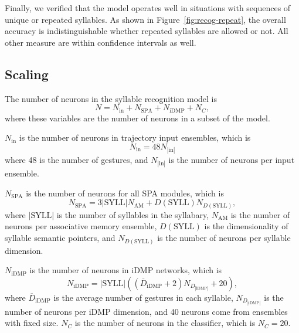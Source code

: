 
Finally, we verified that the model
operates well in situations with
sequences of unique or repeated syllables.
As shown in Figure~\ref{fig:recog-repeat},
the overall accuracy is indistinguishable
whether repeated syllables are allowed or not.
All other measure are within confidence intervals as well.

\subsection{Scaling}

The number of neurons in the
syllable recognition model is
\begin{equation}
  N = N_{\text{in}} + N_{\text{SPA}} + N_{\text{iDMP}} + N_C,
\end{equation}
where these variables
are the number of neurons in
a subset of the model.

$N_{\text{in}}$ is the number of neurons
in trajectory input ensembles, which is
\begin{equation}
  N_{\text{in}} = 48 N_{|\text{in}|}
\end{equation}
where 48 is the number of gestures,
and $N_{|\text{in}|}$ is the number of neurons
per input ensemble.

$N_{\text{SPA}}$ is the number of
neurons for all SPA modules,
which is
\begin{equation}
  N_{\text{SPA}} = 3 |\text{SYLL}| N_{\text{AM}}
    + D(\text{SYLL}) N_{D(\text{SYLL})},
\end{equation}
where $|\text{SYLL}|$ is the number of
syllables in the syllabary,
$N_{\text{AM}}$ is the number of neurons
per associative memory ensemble,
$D(\text{SYLL})$ is the dimensionality
of syllable semantic pointers,
and $N_{D(\text{SYLL})}$ is the number of neurons
per syllable dimension.

$N_{\text{iDMP}}$ is the number of neurons
in iDMP networks, which is
\begin{equation}
  N_{\text{iDMP}} = |\text{SYLL}| \left( \left(\overline{D}_{\text{iDMP}}
  + 2 \right) N_D_{|\text{iDMP}|} + 20 \right),
\end{equation}
where $\overline{D}_{\text{iDMP}}$ is the average
number of gestures in each syllable,
$N_D_{|\text{iDMP}|}$ is the number of neurons
per iDMP dimension,
and 40 neurons come from ensembles with fixed size.
$N_C$ is the number of neurons
in the classifier,
which is $N_C = 20$.

